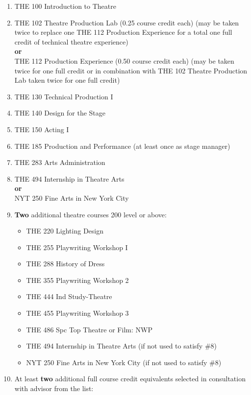 \documentclass[
  letterpaper,
]{scrbook}
\providecommand{\tightlist}{%
  \setlength{\itemsep}{0pt}\setlength{\parskip}{0pt}}
\begin{document}
\begin{enumerate}
\def\labelenumi{\arabic{enumi}.}
\tightlist
\item
  THE 100 Introduction to Theatre\\
\item
  THE 102 Theatre Production Lab (0.25 course credit each) (may be taken
  twice to replace one THE 112 Production Experience for a total one
  full credit of technical theatre experience)\\
  \textbf{or}\\
  THE 112 Production Experience (0.50 course credit each) (may be taken
  twice for one full credit or in combination with THE 102 Theatre
  Production Lab taken twice for one full credit)\\
\item
  THE 130 Technical Production I\\
\item
  THE 140 Design for the Stage\\
\item
  THE 150 Acting I\\
\item
  THE 185 Production and Performance (at least once as stage manager)\\
\item
  THE 283 Arts Administration\\
\item
  THE 494 Internship in Theatre Arts\\
  \textbf{or}\\
  NYT 250 Fine Arts in New York City\\
\item
  \textbf{Two} additional theatre courses 200 level or above:

  \begin{itemize}
  \tightlist
  \item
    THE 220 Lighting Design\\
  \item
    THE 255 Playwriting Workshop I\\
  \item
    THE 288 History of Dress\\
  \item
    THE 355 Playwriting Workshop 2\\
  \item
    THE 444 Ind Study-Theatre\\
  \item
    THE 455 Playwriting Workshop 3\\
  \item
    THE 486 Spc Top Theatre or Film: NWP\\
  \item
    THE 494 Internship in Theatre Arts (if not used to satisfy \#8)\\
  \item
    NYT 250 Fine Arts in New York City (if not used to satisfy \#8)\\
  \end{itemize}
\item
  At least \textbf{two} additional full course credit equivalents
  selected in consultation with advisor from the list:


\end{enumerate}
\end{document}
